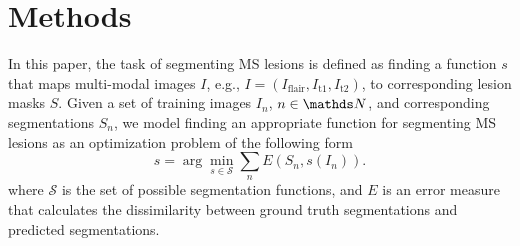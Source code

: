 \section{Methods}
\label{sec:method}

In this paper, the task of segmenting MS lesions is defined as finding a
function $s$ that maps multi-modal images $I$, e.g., $I = (I_\text{flair}, I_\text{t1}, I_\text{t2})$, to corresponding
lesion masks $S$. Given a set of training images $I_n$, $n \in \N$, and
corresponding segmentations $S_n$, we model finding an appropriate function for
segmenting MS lesions as an optimization problem of the following form
\begin{equation}
\hat{s} = \arg \min_{s \in \mathcal{S}} \sum_n E(S_n, s(I_n)).
\label{eq:segprob}
\end{equation}
where $\mathcal{S}$ is the set of possible segmentation functions, and $E$ is an
error measure that calculates the dissimilarity between ground truth
segmentations and predicted segmentations.


% 
% 
% 

